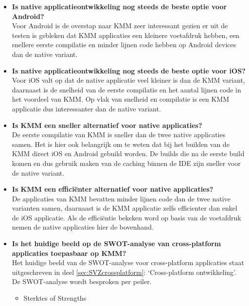 \begin{itemize}
    \item \textbf{Is native applicatieontwikkeling nog steeds de beste optie voor Android?}\\
    Voor Android is de overstap naar KMM zeer interessant gezien er uit de testen is gebleken dat KMM applicaties een kleinere voetafdruk hebben, een snellere eerste compilatie en minder lijnen code hebben op Android devices dan de native variant.
    \\
    \item \textbf{Is native applicatieontwikkeling nog steeds de beste optie voor iOS?}\\
    Voor iOS valt op dat de native applicatie veel kleiner is dan de KMM variant, daarnaast is de snelheid van de eerste compilatie en het aantal lijnen code in het voordeel van KMM. Op vlak van snelheid en compilatie is een KMM applicatie dus interessanter dan de native variant.
    \\
    \item \textbf{Is KMM een sneller alternatief voor native applicaties?}\\
    De eerste compilatie van KMM is sneller dan de twee native applicaties samen. Het is hier ook belangrijk om te weten dat bij het builden van de KMM direct iOS en Android gebuild worden. De builds die na de eerste build komen en dus gebruik maken van de caching binnen de IDE zijn sneller voor de native variant.
    \\
    \item \textbf{Is KMM een efficiënter alternatief voor native applicaties?}\\
    De applicaties van KMM bevatten minder lijnen code dan de twee native varianten samen, daarnaast is de KMM applicatie zelfs efficienter dan enkel de iOS applicatie. Als de efficiëntie bekeken word op basis van de voetafdruk nemen de native applicaties hier de bovenhand.
    \\
    \item \textbf{Is het huidige beeld op de SWOT-analyse van cross-platform applicaties toepasbaar op KMM?}\\
    Het huidige beeld van de SWOT-analyse voor cross-platform applicaties staat uitgeschreven in deel \ref{sec:SVZcrossplatform}: `Cross-platform ontwikkeling'. De SWOT-analyse wordt besproken per peiler.
    \begin{itemize}
        \item Sterktes of Strengths\\

\end{itemize}
\end{itemize}

